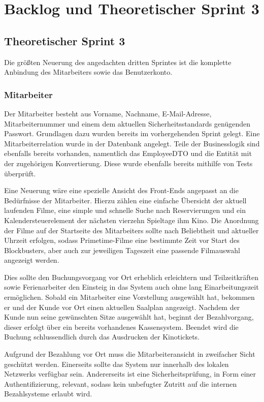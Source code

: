 \section{Backlog und Theoretischer Sprint 3}

\subsection{Theoretischer Sprint 3}
\label{ssec:theoretischer_sprint}
Die größten Neuerung des angedachten dritten Sprintes ist die komplette Anbindung des Mitarbeiters sowie das Benutzerkonto. 

\subsubsection*{Mitarbeiter}
\label{ssssec:sprint_mitarbeiter}
Der Mitarbeiter besteht aus Vorname, Nachname, E-Mail-Adresse, Mitarbeiternummer und einem dem aktuellen Sicherheitsstandards genügenden Passwort.
Grundlagen dazu wurden bereits im vorhergehenden Sprint gelegt.
Eine Mitarbeiterrelation wurde in der Datenbank angelegt.
Teile der Businesslogik sind ebenfalls bereits vorhanden, namentlich das Employee\acs{DTO} und die Entität mit der zugehörigen Konvertierung.
Diese wurde ebenfalls bereits mithilfe von Tests überprüft.

Eine Neuerung wäre eine spezielle Ansicht des Front-Ends angepasst an die Bedürfnisse der Mitarbeiter. 
Hierzu zählen eine einfache Übersicht der aktuell laufenden Filme, eine simple und schnelle Suche nach Reservierungen und ein Kalendersteuerelement der nächsten vierzehn Spieltage ihm Kino.
Die Anordnung der Filme auf der Startseite des Mitarbeiters sollte nach Beliebtheit und aktueller Uhrzeit erfolgen, sodass Primetime-Filme eine bestimmte Zeit vor Start des Blockbusters, aber auch zur jeweiligen Tageszeit eine passende Filmauswahl angezeigt werden.

Dies sollte den Buchungsvorgang vor Ort erheblich erleichtern und Teilzeitkräften sowie Ferienarbeiter den Einsteig in das System auch ohne lang Einarbeitungszeit ermöglichen.
Sobald ein Mitarbeiter eine Vorstellung ausgewählt hat, bekommen er und der Kunde vor Ort einen aktuellen Saalplan angezeigt.
Nachdem der Kunde nun seine gewünschten Sitze ausgewählt hat, beginnt der Bezahlvorgang, dieser erfolgt über ein bereits vorhandenes Kassensystem. Beendet wird die Buchung schlussendlich durch das Ausdrucken der Kinotickets.

Aufgrund der Bezahlung vor Ort muss die Mitarbeiteransicht in zweifacher Sicht geschützt werden.
Einerseits sollte das System nur innerhalb des lokalen Netzwerks verfügbar sein.
Andererseits ist eine Sicherheitsprüfung, in Form einer Authentifizierung, relevant, sodass kein unbefugter Zutritt auf die internen Bezahlsysteme erlaubt wird.

